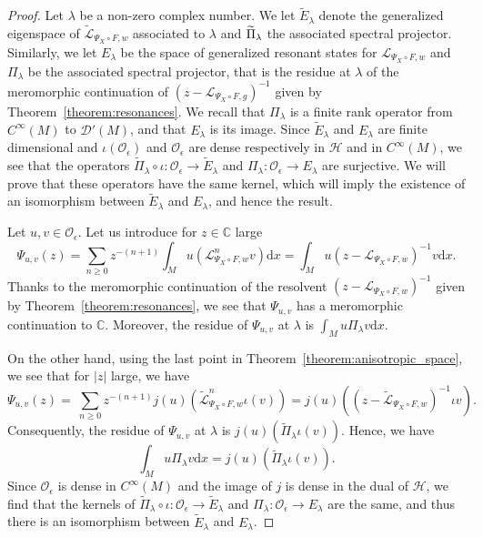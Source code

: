 \documentclass[10pt]{amsart}
\theoremstyle{definition}\newtheorem{defi}[theo]{Definition}\newtheorem{rema}[theo]{Remark}\newtheorem{exam}[theo]{Example}\newtheorem{exem}[theo]{Example}\newtheorem{nota}[theo]{Notation}
\newcommand{\p}[1]{\left(#1\right)}
\newcommand{\clO}{\mathcal{O}}
\newcommand{\clL}{\mathcal{L}}
\newcommand{\clD}{\mathcal{D}}
\newcommand{\clH}{\mathcal{H}}
\newcommand{\bbC}{\mathbb{C}}
\newcommand{\rmd}{\mathrm{d}}
\let\oldtilde\tilde
\renewcommand*{\tilde}[1]{\mathchoice{\widetilde{#1}}{\widetilde{#1}}{\oldtilde{#1}}{\oldtilde{#1}}}
\begin{document}
\begin{proof}
Let $\lambda$ be a non-zero complex number. We let $\widetilde{E}_\lambda$ denote the generalized eigenspace of $\widetilde{\clL}_{\Psi_X \circ F,w}$ associated to $\lambda$ and $\tilde{\Pi}_\lambda$ the associated spectral projector. Similarly, we let $E_\lambda$ be the space of generalized resonant states for $\clL_{\Psi_X \circ F,w}$ and $\Pi_\lambda$ be the associated spectral projector, that is the residue at $\lambda$ of the meromorphic continuation of $(z - \clL_{\Psi_X \circ F,g})^{-1}$ given by Theorem~\ref{theorem:resonances}. We recall that $\Pi_\lambda$ is a finite rank operator from $C^\infty(M)$ to $\clD'(M)$, and that $E_\lambda$ is its image. Since $\widetilde{E}_\lambda$ and $E_\lambda$ are finite dimensional and $\iota(\clO_\epsilon)$ and $\clO_\epsilon$ are dense respectively in $\clH$ and in $C^\infty(M)$, we see that the operators $\widetilde{\Pi}_\lambda \circ \iota : \clO_\epsilon \to \widetilde{E}_\lambda$ and $\Pi_\lambda : \clO_\epsilon \to E_\lambda$ are surjective. We will prove that these operators have the same kernel, which will imply the existence of an isomorphism between $\widetilde{E}_\lambda$ and $E_\lambda$, and hence the result.

Let $u,v \in \clO_\epsilon$. Let us introduce for $z \in \bbC$ large
\begin{equation*}
\Psi_{u,v}(z) = \sum_{n \geq 0} z^{-(n+1)} \int_M u \left(\clL_{\Psi_X \circ F,w}^n v\right) \rmd x = \int_{M} u \left(z - \clL_{\Psi_X \circ F,w}\right)^{-1} v \rmd x.
\end{equation*}
Thanks to the meromorphic continuation of the resolvent $(z - \clL_{\Psi_X \circ F,w})^{-1}$ given by Theorem~\ref{theorem:resonances}, we see that $\Psi_{u,v}$ has a meromorphic continuation to $\bbC$. Moreover, the residue of $\Psi_{u,v}$ at $\lambda$ is $\int_M u \Pi_\lambda v \rmd x$.

On the other hand, using the last point in Theorem~\ref{theorem:anisotropic_space}, we see that for $|z|$ large, we have
\begin{equation*}
\Psi_{u,v}(z) = \ \sum_{n \geq 0} z^{-(n+1)} j(u)\p{\widetilde{\clL}_{\Psi_X \circ F,w}^n \iota(v)} = j(u)\p{\left(z - \widetilde{\clL}_{\Psi_X \circ F,w}\right)^{-1} \iota v}.
\end{equation*}
Consequently, the residue of $\Psi_{u,v}$ at $\lambda$ is $j(u)\p{\widetilde{\Pi}_\lambda \iota(v)}$. Hence, we have
\begin{equation*}
\int_M u \Pi_\lambda v \rmd x = j(u)\p{\widetilde{\Pi}_\lambda \iota(v)}.
\end{equation*}
Since $\clO_\epsilon$ is dense in $C^\infty(M)$ and the image of $j$ is dense in the dual of $\clH$, we find that the kernels of $\widetilde{\Pi}_\lambda \circ \iota : \clO_\epsilon \to \widetilde{E}_\lambda$ and $\Pi_\lambda : \clO_\epsilon \to E_\lambda$ are the same, and thus there is an isomorphism between $\widetilde{E}_\lambda$ and $E_\lambda$.
\end{proof}
\end{document}

